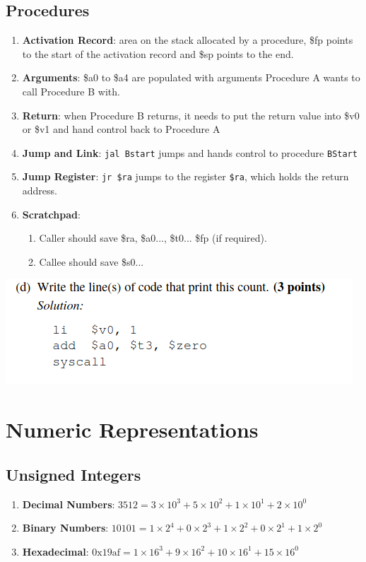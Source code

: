 \documentclass{article}
\begin{document}
\subsection{Procedures}
\begin{enumerate}
    \item \textbf{Activation Record}: area on the stack allocated by a procedure, \$fp points to the start of the activation record and \$sp points to the end.
    \item \textbf{Arguments}: \$a0 to \$a4 are populated with arguments Procedure A wants to call Procedure B with.
    \item \textbf{Return}: when Procedure B returns, it needs to put the return value into \$v0 or \$v1 and hand control back to Procedure A
    \item \textbf{Jump and Link}: \verb|jal Bstart| jumps and hands control to procedure \verb|BStart|
    \item \textbf{Jump Register}: \verb|jr $ra| jumps to the register \verb|$ra|, which holds the return address.
    \item \textbf{Scratchpad}:
    \begin{enumerate}
        \item Caller should save \$ra, \$a0..., \$t0... \$fp (if required).
        \item Callee should save \$s0...
    \end{enumerate}
\end{enumerate}
\includegraphics[width=0.50\linewidth]{print_value.png}
\section{Numeric Representations}
\subsection{Unsigned Integers}
\begin{enumerate}
    \item \textbf{Decimal Numbers}: $3512 = 3 \times 10^3 + 5 \times 10^2 + 1 \times 10^1 + 2 \times 10^0$
    \item \textbf{Binary Numbers}: $10101 = 1 \times 2^4 + 0 \times 2^3 + 1 \times 2^2 + 0 \times 2^1 + 1 \times 2^0$
    \item \textbf{Hexadecimal}: $\text{0x19af} = 1 \times 16^3 + 9 \times 16^2 + 10 \times 16^1 + 15 \times 16^0$
\end{enumerate}
\end{document}
